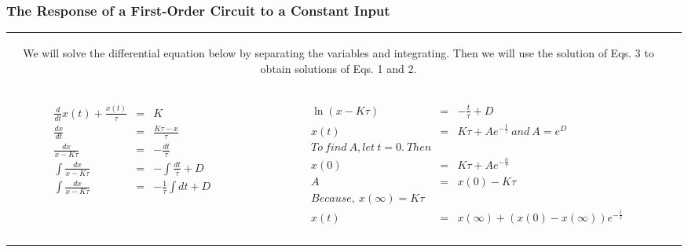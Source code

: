 \documentclass[aspectratio=169]{beamer}
\begin{document}
\begin{frame}[fragile]
	\frametitle{The Response of a First-Order Circuit to a Constant Input}

		\begin{tabular}{cc}
				\begin{columns}
				\begin{column}{1\textwidth}  %
\small	We will solve the differential equation below by separating the
variables and integrating. Then we will use the solution of Eqs. 3 to obtain solutions of Eqs. 1
and 2. \newline
				\end{column}
			\end{columns}\\	

				\begin{columns}
				\begin{column}{.2\textwidth}  %
\footnotesize	\begin{eqnarray}	 	
			  \frac{d}{dt}x(t)+\frac{x(t)}{\tau}&=&K \\ \nonumber
			  \frac{dx}{dt}&=& \frac{K \tau-x}{\tau} \\ \nonumber
			  \frac{dx}{x-K \tau}&=& -\frac{dt}{\tau} \\ \nonumber
			 \int \frac{dx}{x-K \tau}&=& -\int \frac{dt}{\tau} + D\\ \nonumber
			 \int \frac{dx}{x-K \tau}&=& -\frac{1}{\tau} \int dt + D\\ \nonumber
	\end{eqnarray}
				\end{column}
				\begin{column}{.8\textwidth}  %
\footnotesize	\begin{eqnarray}	 	
	\nonumber		 \ln(x-K \tau)&=& -\frac{t}{\tau} + D\\ \nonumber
			  x(t)&=&K\tau+A e^{-\frac{t}{\tau}} \ and \ A=e^D \\ \nonumber
			  To \ find \ A, let \ t=0. \ Then \\ \nonumber
			  x(0)&=&K\tau+A e^{-\frac{0}{\tau}} \\ \nonumber
			 A&=& x(0)-K\tau \\ \nonumber
			 Because, \ x(\infty)=K\tau\\ 
			 x(t)&=&x(\infty)+(x(0)-x(\infty)) e^{-\frac{t}{\tau}} \\ \nonumber
	\end{eqnarray}
				\end{column}
			\end{columns}\\	

					
\end{tabular}	
	
\end{frame}
\end{document}
